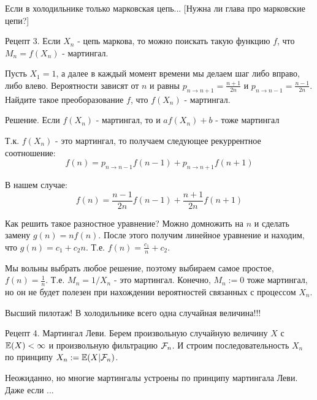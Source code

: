 {Если в холодильнике только марковская цепь... [Нужна ли глава про марковские цепи?]

Рецепт 3. Если $X_{n}$ - цепь маркова, то можно поискать такую функцию $f$, что $M_{n}=f(X_{n})$ - мартингал.

\begin{myex}
Пусть $X_{1}=1$, а далее в каждый момент времени мы делаем шаг либо вправо, либо влево. Вероятности зависят от $n$ и равны $p_{n\to n+1}=\frac{n+1}{2n}$ и $p_{n\to n-1}=\frac{n-1}{2n}$. Найдите такое преоборазование $f$, что $f(X_{n})$ - мартингал.

Решение. Если $f(X_{n})$ - мартингал, то и $af(X_{n})+b$ - тоже мартингал

Т.к. $f(X_{n})$ - это мартингал, то получаем следующее рекуррентное соотношение:
\begin{equation}
f(n)=p_{n\to n-1} f(n-1)+p_{n\to n+1} f(n+1)
\end{equation}

В нашем случае:
\begin{equation}
f(n)=\frac{n-1}{2n}f(n-1)+\frac{n+1}{2n} f(n+1)
\end{equation}

Как решить такое разностное уравнение? Можно домножить на $n$ и сделать замену $g(n)=nf(n)$. После этого получим линейное уравнение и находим, что $g(n)=c_{1}+c_{2}n$. Т.е. $f(n)=\frac{c_{1}}{n}+c_{2}$.

Мы вольны выбрать любое решение, поэтому выбираем самое простое, $f(n)=\frac{1}{n}$. Т.е. $M_{n}=1/X_{n}$ - это мартингал. Конечно, $M_{n}:=0$ тоже мартингал, но он не будет полезен при нахождении вероятностей связанных с процессом $X_{n}$.
\end{myex}







Высший пилотаж! В холодильнике всего одна случайная величина!!!

\begin{myex}
Рецепт 4. Мартингал Леви. Берем произвольную случайную величину $X$ с $\mathbb{E}(X)<\infty$ и произвольную фильтрацию $\mathcal{F}_{n}$. И строим последовательность $X_{n}$ по принципу $X_{n}:=\mathbb{E}(X|\mathcal{F}_{n})$. 
\end{myex}

Неожиданно, но многие мартингалы устроены по принципу мартингала Леви. Даже если ...









}

